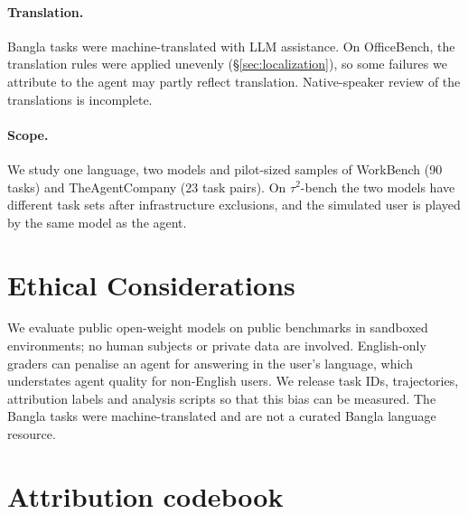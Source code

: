 \documentclass[11pt]{article}
\newcommand{\OB}{OfficeBench}
\newcommand{\WB}{WorkBench}
\newcommand{\TAU}{$\tau^2$-bench}
\newcommand{\TAC}{TheAgentCompany}
\begin{document}
\paragraph{Translation.} Bangla tasks were machine-translated with LLM assistance. On \OB{}, the
translation rules were applied unevenly (\S\ref{sec:localization}), so some failures we attribute
to the agent may partly reflect translation. Native-speaker review of the translations is
incomplete.

\paragraph{Scope.} We study one language, two models and pilot-sized samples of \WB{} (90 tasks)
and \TAC{} (23 task pairs). On \TAU{} the two models have different task sets after infrastructure
exclusions, and the simulated user is played by the same model as the agent.

\section*{Ethical Considerations}
We evaluate public open-weight models on public benchmarks in sandboxed environments; no human
subjects or private data are involved. English-only graders can penalise an agent for answering in
the user's language, which understates agent quality for non-English users. We release task IDs,
trajectories, attribution labels and analysis scripts so that this bias can be measured. The
Bangla tasks were machine-translated and are not a curated Bangla language resource.



\appendix

\section{Attribution codebook}
\label{app:codebook}
\end{document}
